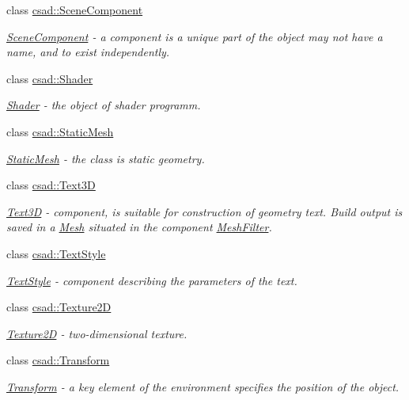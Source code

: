 \begin{DoxyCompactItemize}
class \hyperlink{classcsad_1_1_scene_component}{csad\-::\-Scene\-Component}
\begin{DoxyCompactList}\small\item\em \hyperlink{classcsad_1_1_scene_component}{Scene\-Component} -\/ a component is a unique part of the object may not have a name, and to exist independently. \end{DoxyCompactList}\item 
class \hyperlink{classcsad_1_1_shader}{csad\-::\-Shader}
\begin{DoxyCompactList}\small\item\em \hyperlink{classcsad_1_1_shader}{Shader} -\/ the object of shader programm. \end{DoxyCompactList}\item 
class \hyperlink{classcsad_1_1_static_mesh}{csad\-::\-Static\-Mesh}
\begin{DoxyCompactList}\small\item\em \hyperlink{classcsad_1_1_static_mesh}{Static\-Mesh} -\/ the class is static geometry. \end{DoxyCompactList}\item 
class \hyperlink{classcsad_1_1_text3_d}{csad\-::\-Text3\-D}
\begin{DoxyCompactList}\small\item\em \hyperlink{classcsad_1_1_text3_d}{Text3\-D} -\/ component, is suitable for construction of geometry text. Build output is saved in a \hyperlink{classcsad_1_1_mesh}{Mesh} situated in the component \hyperlink{classcsad_1_1_mesh_filter}{Mesh\-Filter}. \end{DoxyCompactList}\item 
class \hyperlink{classcsad_1_1_text_style}{csad\-::\-Text\-Style}
\begin{DoxyCompactList}\small\item\em \hyperlink{classcsad_1_1_text_style}{Text\-Style} -\/ component describing the parameters of the text. \end{DoxyCompactList}\item 
class \hyperlink{classcsad_1_1_texture2_d}{csad\-::\-Texture2\-D}
\begin{DoxyCompactList}\small\item\em \hyperlink{classcsad_1_1_texture2_d}{Texture2\-D} -\/ two-\/dimensional texture. \end{DoxyCompactList}\item 
class \hyperlink{classcsad_1_1_transform}{csad\-::\-Transform}
\begin{DoxyCompactList}\small\item\em \hyperlink{classcsad_1_1_transform}{Transform} -\/ a key element of the environment specifies the position of the object. \end{DoxyCompactList}\item 

\end{DoxyCompactItemize}
